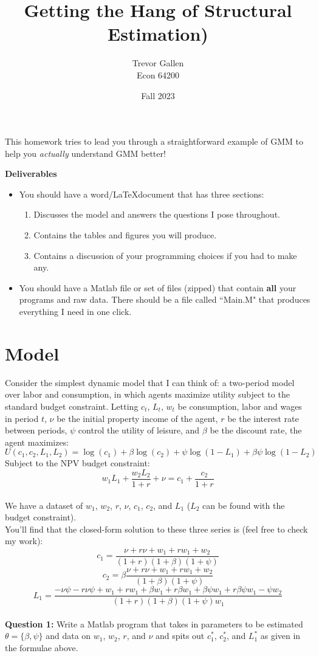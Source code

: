 \documentclass[11pt]{article}
\title{Getting the Hang of Structural Estimation)  }
\author{ Trevor Gallen \\ Econ 64200 }
\date{Fall 2023}
\begin{document}


\maketitle

This homework tries to lead you through a straightforward example of GMM to help you \emph{actually} understand GMM better!  


\textbf{Deliverables}
\begin{itemize}
\item You should have a word/\LaTeX document that has three sections: 
\begin{enumerate}
\item Discusses the model and answers the questions I pose throughout.
\item Contains the tables and figures you will produce.
\item Contains a discussion of your programming choices if you had to make any.
\end{enumerate}
\item You should have a Matlab file or set of files (zipped) that contain \textbf{all} your programs and raw data.  There should be a file called ``Main.M" that produces everything I need in one click.
\end{itemize}


\section{Model}
Consider the simplest dynamic model that I can think of: a two-period model over labor and consumption, in which agents maximize utility subject to the standard budget constraint.  Letting $c_t$, $L_t$, $w_t$ be consumption, labor and wages in period $t$, $\nu$ be the initial property income of the agent,  $r$ be the interest rate between periods, $\psi$ control the utility of leisure, and $\beta$ be the discount rate, the agent maximizes:
$$U(c_1,c_2,L_1,L_2)=\log(c_1)+\beta\log(c_2)+\psi\log(1-L_1)+\beta\psi\log(1-L_2)$$
Subject to the NPV budget constraint:
$$w_1L_1+\frac{w_2L_2}{1+r}+\nu=c_1+\frac{c_2}{1+r}$$
\ \\
We have a dataset of $w_1$, $w_2$, $r$, $\nu$, $c_1$, $c_2$, and $L_1$ ($L_2$ can be found with the budget constraint).  \
\ \\
You'll find that the closed-form solution to these three series is (feel free to check my work):
$$c_1=\frac{\nu+r \nu+w_1+r w_1+w_2}{(1+r) (1+\beta) (1+\psi)}$$
$$c_2=\beta\frac{\nu+r \nu+w_1+r w_1+w_2}{(1+\beta) (1+\psi)}$$
$$L_1=\frac{-\nu \psi-r \nu \psi+w_1+r w_1+\beta w_1+r \beta w_1+\beta \psi w_1+r \beta \psi w_1-\psi w_2}{(1+r) (1+\beta) (1+\psi) w_1}$$
\ \\
\textbf{Question 1:} Write a Matlab program that takes in parameters to be estimated $\theta=\{\beta,\psi\}$ and data on $w_1$, $w_2$, $r$, and $\nu$ and spits out $c_1^*$, $c_2^*$, and $L_1^*$ as given in the formulae above.  \\
\ \\
\end{document}
